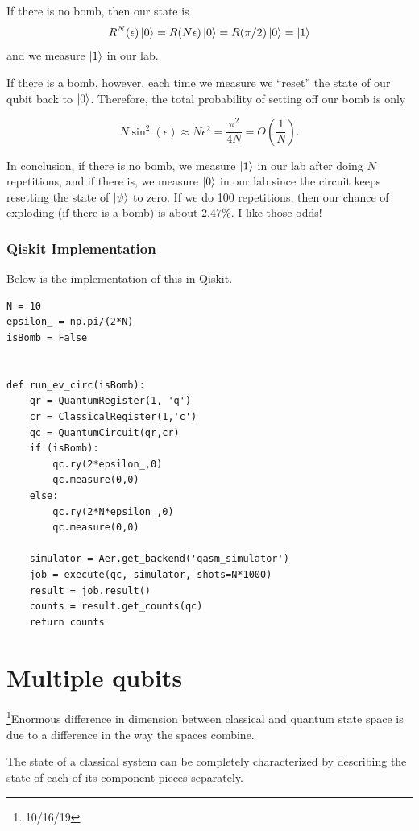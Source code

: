 \documentclass[12pt]{article}
\begin{document}
If there is no bomb, then our state is 
\[
R^N(\epsilon)\ket{0} = R(N\epsilon)\ket{0} = R(\pi/2)\ket{0} = \ket{1}    
\]
and we measure $\ket{1}$ in our lab. 

If there is a bomb, however, each time we measure we ``reset'' the state of our qubit
back to $\ket{0}$. Therefore, the total probability of setting off our bomb is only 

\[
N\sin^2(\epsilon) \approx N\epsilon^2 = \frac{\pi^2}{4N}  = O\left(\frac{1}{N}\right)  .
\]

In conclusion, if there is no bomb, we measure $\ket{1}$ in our lab after doing $N$ repetitions, and if there is, 
we measure $\ket{0}$ in our lab since the circuit keeps resetting the state of $\ket{\psi}$ to zero. If we do 
100 repetitions, then our chance of exploding (if there is a bomb) is about $2.47\%$. I like 
those odds!

\subsubsection{Qiskit Implementation}
Below is the implementation of this in Qiskit. 

\begin{lstlisting}[numbers=none]
N = 10
epsilon_ = np.pi/(2*N)
isBomb = False


def run_ev_circ(isBomb):
    qr = QuantumRegister(1, 'q')
    cr = ClassicalRegister(1,'c')
    qc = QuantumCircuit(qr,cr)
    if (isBomb):
        qc.ry(2*epsilon_,0)
        qc.measure(0,0)
    else:
        qc.ry(2*N*epsilon_,0)
        qc.measure(0,0)

    simulator = Aer.get_backend('qasm_simulator')
    job = execute(qc, simulator, shots=N*1000)
    result = job.result()
    counts = result.get_counts(qc)
    return counts
\end{lstlisting}









\section{Multiple qubits}
\footnote{10/16/19}Enormous difference in dimension between classical and
quantum state space is due to a difference in the way the spaces combine.

The state of a classical system can be completely characterized by describing
the state of each of its component pieces separately.
\end{document}
